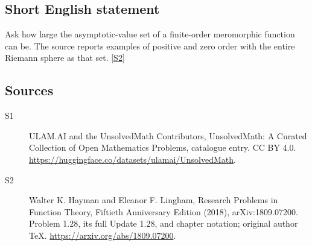 \documentclass[11pt]{article}
\newcommand{\sref}[2]{\hyperlink{source:#1:#2}{[S#2]}}
\begin{document}
\subsection{Short English statement}
Ask how large the asymptotic-value set of a finite-order meromorphic function can be. The source reports examples of positive and zero order with the entire Riemann sphere as that set. \sref{statement}{2}
\subsection{Sources}
\begin{description}
\item[\hypertarget{source:statement:1}{S1}] ULAM.AI and the UnsolvedMath Contributors, UnsolvedMath: A Curated Collection of Open Mathematics Problems, catalogue entry. CC BY 4.0. \url{https://huggingface.co/datasets/ulamai/UnsolvedMath}.
\item[\hypertarget{source:statement:2}{S2}] Walter K. Hayman and Eleanor F. Lingham, Research Problems in Function Theory, Fiftieth Anniversary Edition (2018), arXiv:1809.07200. Problem 1.28, its full Update 1.28, and chapter notation; original author TeX. \url{https://arxiv.org/abs/1809.07200}.
\end{description}
\label{end:statement}
\end{document}

